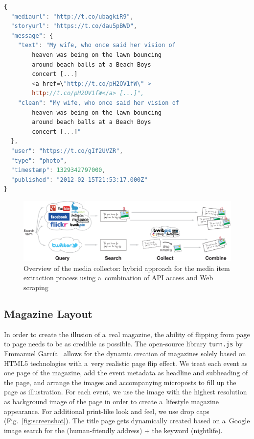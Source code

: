 \documentclass[runningheads,a4paper]{llncs}
\begin{document}
{\begin{lstlisting}[language=JavaScript,caption={Sample output of the media collector showing a~\mbox{Google+} post (edited for legibility, URLs shortened).},label={lst:media}]
{
  "mediaurl": "http://t.co/ubagkiR9",
  "storyurl": "https://t.co/dau5pBWD",
  "message": {
    "text": "My wife, who once said her vision of
        heaven was being on the lawn bouncing
        around beach balls at a Beach Boys
        concert [...]
        <a href=\"http://t.co/pH2OV1fW\" >
        http://t.co/pH2OV1fW</a> [...]",
    "clean": "My wife, who once said her vision of
        heaven was being on the lawn bouncing
        around beach balls at a Beach Boys
        concert [...]"
  },
  "user": "https://t.co/gIf2UVZR",
  "type": "photo",
  "timestamp": 1329342797000,
  "published": "2012-02-15T21:53:17.000Z"
}
\end{lstlisting}

\begin{figure}[b!]
\centering
\includegraphics[width=0.8\linewidth]{./architecture.pdf}
\caption{Overview of the media collector: hybrid approach for the media item extraction process using a~combination of API access and Web scraping}
\label{fig:architecture}
\end{figure}

\subsection{Magazine Layout}                                                \label{sec:magazine-layout}
In order to create the illusion of a~real magazine, the ability of flipping from page to page needs to be as credible as possible. The open-source library \texttt{turn.js} by Emmanuel García~\cite{TurnJs2012} allows for the dynamic creation of magazines solely based on HTML5 technologies with a~very realistic page flip effect. We treat each event as one page of the magazine, add the event metadata as headline and subheading of the page, and arrange the images and accompanying microposts to fill up the page as illustration. For each event, we use the image with the highest resolution as background image of the page in order to create a~lifestyle magazine appearance. For additional print-like look and feel, we use drop caps (Fig.~\ref{fig:screenshot}). The title page gets dynamically created based on a~Google image search for the (human-friendly address) $+$ the keyword (nightlife).

}
\end{document}
